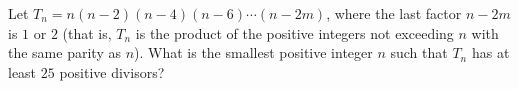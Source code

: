 Let $T_n=n(n-2)(n-4)(n-6)\cdots(n-2m)$, where the last factor $n-2m$ is $1$ or $2$ (that is, $T_n$ is the product of the positive integers not exceeding $n$ with the same parity as $n$). What is the smallest positive integer $n$ such that $T_n$ has at least $25$ positive divisors?
